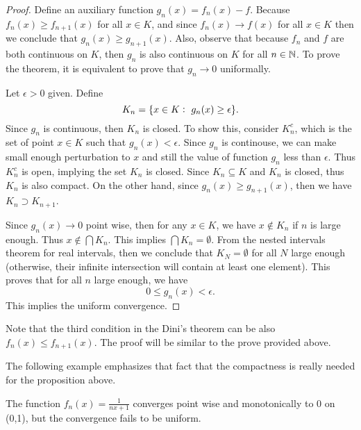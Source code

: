 \begin{proof}
	Define an auxiliary function $ g_n(x) = f_n(x)-f$. Because $ f_n(x) \geq f_{n+1}(x) $ for all $ x \in K $, and since $ f_n(x)\to f(x) $ for all $ x\in K $ then we conclude that $ g_n(x) \geq g_{n+1}(x) $. Also, observe that because $ f_n $ and $ f $ are both continuous on $ K $, then $ g_n $ is also continuous on $ K $ for all $ n \in \mathbb{N} $. To prove the theorem, it is equivalent to prove that $ g_n \to 0$ uniformally. 
	
	\noindent Let $\epsilon>0$ given. Define 
	\[ K_n = \{x\in K:\ g_n(x) \geq \epsilon\}. \]
	Since $ g_n $ is continuous, then $ K_n $ is closed. To show this, consider $ K_n^c $, which is the set of point $ x \in K $ such that $ g_n(x)<\epsilon $. Since $ g_n $ is continouse, we can make small enough perturbation to $  x $ and still the value of function $ g_n $ less than $ \epsilon $. Thus $ K_n^c $ is open, implying the set $ K_n $ is closed. Since $ K_n \subseteq K $ and $ K_n  $ is closed, thus $ K_n $ is also compact. On the other hand, since $ g_n(x) \geq g_{n+1}(x)  $, then we have 
	$ K_n \supset K_{n+1} $.  
	
	\noindent Since $ g_n(x) \to 0 $ point wise, then for any $ x \in K $,  we have $ x \notin K_n $ if $ n $ is large enough. Thus $ x \notin \bigcap K_n $. This implies $ \bigcap K_n = \emptyset $. From the nested intervals theorem for real intervals, then we conclude that $ K_N = \emptyset$ for all $ N $ large enough (otherwise, their infinite intersection will contain at least one element). This proves that for all $ n $ large enough, we have
	\[ 0 \leq g_n(x) < \epsilon. \]
	This implies the uniform convergence. 
\end{proof}

\begin{remark}
	Note that the third condition in the Dini's theorem can be also $ f_n(x)\leq f_{n+1}(x) $. The proof will be similar to the prove provided above.
\end{remark}


The following example emphasizes that fact that the compactness is really needed for the proposition above.

\begin{example}
	The function $ f_n(x)= \frac{1}{nx + 1}$ converges point wise and monotonically to $ 0 $ on (0,1), but the convergence fails to be uniform.
\end{example}

